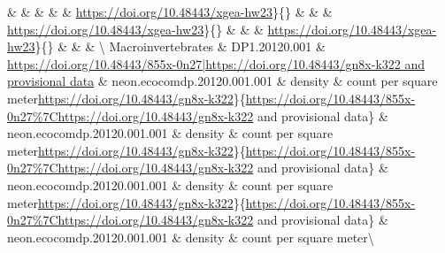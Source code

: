 \documentclass[
  12pt,
]{article}
\begin{document}
 \&  \& \href{https://doi.org/10.48443/tx5f-dy17|https://doi.org/10.48443/xgea-hw23}{} \&  \&  \& \textbar{}\url{https://doi.org/10.48443/xgea-hw23}\}\{\} \&  \&  \& \textbar{}\url{https://doi.org/10.48443/xgea-hw23}\}\{\} \&  \&  \& \textbar{}\url{https://doi.org/10.48443/xgea-hw23}\}\{\} \&  \&  \& \textbackslash{}
Macroinvertebrates \& DP1.20120.001 \& \href{https://doi.org/10.48443/855x-0n27|https://doi.org/10.48443/gn8x-k322}{https://doi.org/10.48443/855x-0n27|https://doi.org/10.48443/gn8x-k322 and provisional data} \& neon.ecocomdp.20120.001.001 \& density \& count per square meter\textbar{}\url{https://doi.org/10.48443/gn8x-k322}\}\{\url{https://doi.org/10.48443/855x-0n27\%7Chttps://doi.org/10.48443/gn8x-k322} and provisional data\} \& neon.ecocomdp.20120.001.001 \& density \& count per square meter\textbar{}\url{https://doi.org/10.48443/gn8x-k322}\}\{\url{https://doi.org/10.48443/855x-0n27\%7Chttps://doi.org/10.48443/gn8x-k322} and provisional data\} \& neon.ecocomdp.20120.001.001 \& density \& count per square meter\textbar{}\url{https://doi.org/10.48443/gn8x-k322}\}\{\url{https://doi.org/10.48443/855x-0n27\%7Chttps://doi.org/10.48443/gn8x-k322} and provisional data\} \& neon.ecocomdp.20120.001.001 \& density \& count per square meter\textbackslash{}
\end{document}
